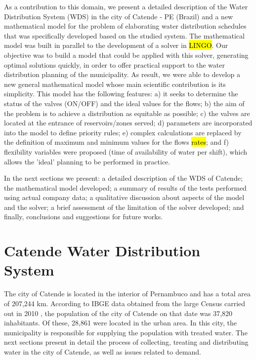 \documentclass{singlecol}
\theoremstyle{TH}{
\newtheorem{lemma}{Lemma}
\newtheorem{theorem}[lemma]{Theorem}
\newtheorem{corrolary}[lemma]{Corrolary}
\newtheorem{conjecture}[lemma]{Conjecture}
\newtheorem{proposition}[lemma]{Proposition}
\newtheorem{claim}[lemma]{Claim}
\newtheorem{stheorem}[lemma]{Wrong Theorem}
\newtheorem{algorithm}{Algorithm}
}
\theoremstyle{THrm}{
\newtheorem{definition}{Definition}[section]
\newtheorem{question}{Question}[section]
\newtheorem{remark}{Remark}
\newtheorem{scheme}{Scheme}
}
\theoremstyle{THhit}{
\newtheorem{case}{Case}[section]
}
\begin{document}
As a contribution to this domain, we present a detailed description of the Water Distribution System (WDS) in the city of Catende - PE (Brazil) and a new mathematical model for the problem of elaborating water distribution schedules that was specifically developed based on the studied system. The mathematical model was built in parallel to the development of a solver in \hl{LINGO}. Our objective was to build a model that could be applied with this solver, generating optimal solutions quickly, in order to offer practical support to the water distribution planning of the municipality. As result, we were able to develop a new general mathematical model whose main scientific contribution is its simplicity. This model has the following features: a) it seeks to determine the status of the valves (ON/OFF) and the ideal values for the flows; b) the aim of the problem is to achieve a distribution as equitable as possible; c) the valves are located at the entrance of reservoirs/zones served; d) parameters are incorporated into the model to define priority rules; e) complex calculations are replaced by the definition of maximum and minimum values for the flows \hl{rates}; and f) flexibility variables were proposed (time of availability of water per shift), which allows the 'ideal' planning to be performed in practice. 

In the next sections we present: a detailed description of the WDS of Catende; the mathematical model developed; a summary of results of the tests performed using actual company data; a qualitative discussion about aspects of the model and the solver; a brief assessment of the limitation of the solver developed; and finally, conclusions and suggestions for future works. 

\section{Catende Water Distribution System}
\label{sec:CatendeWDS}

The city of Catende is located in the interior of Pernambuco and has a total area of 207,244 km. According to IBGE data obtained from the large Census carried out in 2010 \citep{IBGECatende}, the population of the city of Catende on that date was 37,820 inhabitants. Of these, 28,861 were located in the urban area. In this city, the municipality is responsible for supplying the population with treated water. The next sections present in detail the process of collecting, treating and distributing water in the city of Catende, as well as issues related to demand. 
\end{document}
